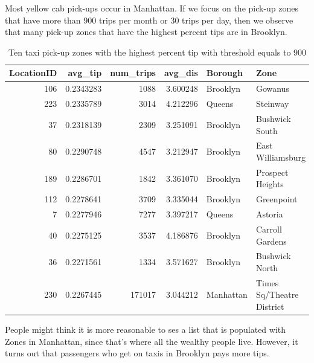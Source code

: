 \documentclass[12pt,twoside]{reedthesis}
\newenvironment{Shaded}{\begin{snugshade}}{\end{snugshade}}
\newcommand{\KeywordTok}[1]{\textcolor[rgb]{0.13,0.29,0.53}{\textbf{#1}}}
\newcommand{\DataTypeTok}[1]{\textcolor[rgb]{0.13,0.29,0.53}{#1}}
\newcommand{\DecValTok}[1]{\textcolor[rgb]{0.00,0.00,0.81}{#1}}
\newcommand{\StringTok}[1]{\textcolor[rgb]{0.31,0.60,0.02}{#1}}
\newcommand{\CommentTok}[1]{\textcolor[rgb]{0.56,0.35,0.01}{\textit{#1}}}
\newcommand{\OperatorTok}[1]{\textcolor[rgb]{0.81,0.36,0.00}{\textbf{#1}}}
\newcommand{\NormalTok}[1]{#1}
\theoremstyle{definition}
\theoremstyle{definition}
\theoremstyle{definition}
\theoremstyle{remark}
\begin{document}
Most yellow cab pick-ups occur in Manhattan. If we focus on the pick-up
zones that have more than 900 trips per month or 30 trips per day, then
we observe that many pick-up zones that have the highest percent tips
are in Brooklyn.
\begin{Shaded}
\end{Shaded}
\begin{table}

\caption{\label{tab:unnamed-chunk-14}Ten taxi pick-up zones with the highest percent tip with threshold equals to 900}
\centering
\begin{tabular}[t]{r|r|r|r|l|l}
\hline
LocationID & avg\_tip & num\_trips & avg\_dis & Borough & Zone\\
\hline
106 & 0.2343283 & 1088 & 3.600248 & Brooklyn & Gowanus\\
\hline
223 & 0.2335789 & 3014 & 4.212296 & Queens & Steinway\\
\hline
37 & 0.2318139 & 2309 & 3.251091 & Brooklyn & Bushwick South\\
\hline
80 & 0.2290748 & 4547 & 3.212947 & Brooklyn & East Williamsburg\\
\hline
189 & 0.2286701 & 1842 & 3.361070 & Brooklyn & Prospect Heights\\
\hline
112 & 0.2278641 & 3709 & 3.335044 & Brooklyn & Greenpoint\\
\hline
7 & 0.2277946 & 7277 & 3.397217 & Queens & Astoria\\
\hline
40 & 0.2275125 & 3537 & 4.186876 & Brooklyn & Carroll Gardens\\
\hline
36 & 0.2271561 & 1334 & 3.571627 & Brooklyn & Bushwick North\\
\hline
230 & 0.2267445 & 171017 & 3.044212 & Manhattan & Times Sq/Theatre District\\
\hline
\end{tabular}
\end{table}
People might think it is more reasonable to ses a list that is populated
with Zones in Manhattan, since that's where all the wealthy people live.
However, it turns out that passengers who get on taxis in Brooklyn pays
more tips.
\end{document}
